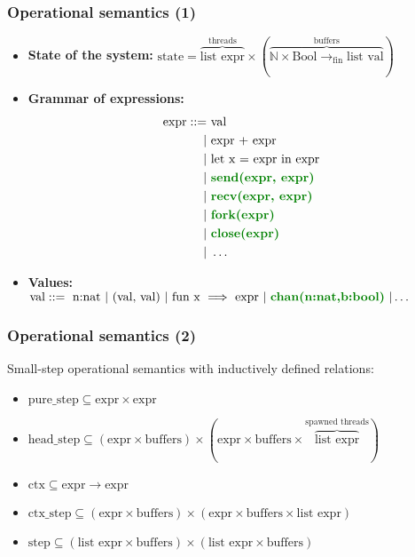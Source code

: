 \documentclass[aspectratio=169]{beamer}
\newcommand{\gemph}[1] {\textcolor{darkgreen}{\textbf{#1}}}
\begin{document}
\begin{frame}[fragile]
  \frametitle{Operational semantics (1)}
  \begin{itemize}
    \item \textbf{State of the system:} $\text{state} = \overbrace{\text{list expr}}^\text{threads} \times
        (\overbrace{\mathbb{N} \times \text{Bool} \to_\text{fin}  \text{list val}}^\text{buffers})$
    \item \textbf{Grammar of expressions:}\begin{equation*}
      \begin{split}
      \text{expr}  ::= & \text{ val} \\
        | & \text{ expr + expr} \\
        | & \text{ let x = expr in expr} \\
        | & \text{ \gemph{send(expr, expr)}} \\
        | & \text{ \gemph{recv(expr, expr)}} \\
        | & \text{ \gemph{fork(expr)}} \\
        | & \text{ \gemph{close(expr)}} \\
        | & \text{ }\dots \\
      \end{split}
      \end{equation*}
  \item \textbf{Values: }
    \(\text{val}  ::=  \text{ n:nat } | \text{ (val, val) } | \text{ fun x $\implies$ expr }  | \text{ \gemph{chan(n:nat,b:bool)} } | \dots\)
  \end{itemize}
\end{frame}

\begin{frame}[fragile]
  \frametitle{Operational semantics (2)}
  Small-step operational semantics with inductively defined relations:
  \begin{itemize}
    \item $\text{pure\_step} \subseteq \text{expr} \times \text{expr}$
    \item $\text{head\_step} \subseteq (\text{expr} \times \text{buffers})
          \times (\text{expr} \times \text{buffers} \times \overbrace{\text{list expr}}^\text{spawned threads})$

    \item $\text{ctx} \subseteq \text{expr} \to \text{expr}$
    \item $\text{ctx\_step} \subseteq (\text{expr} \times \text{buffers})
          \times (\text{expr} \times \text{buffers} \times \text{list expr})$
          \item $\text{step} \subseteq (\text{list expr} \times \text{buffers}) \times (\text{list expr} \times \text{buffers})$
  \end{itemize}
\end{frame}
\end{document}
